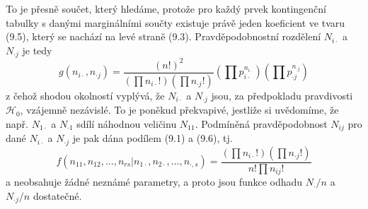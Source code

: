 To je přesně součet, který hledáme, protože pro každý prvek kontingenční tabulky s danými marginálními součty existuje právě jeden koeficient ve tvaru (9.5), který se nachází na levé straně (9.3). Pravděpodobnostní rozdělení $N_{i \cdot}$ a $N_{\cdot j}$ je tedy
\begin{equation}
g(n_{i \cdot}, n_{\cdot j}) = \frac{(n!)^2}{\left(\prod n_{i \cdot}!\right)\left(\prod n_{\cdot j}!\right)}\left(\prod p_{i \cdot}^{n_{i \cdot}}\right)\left(\prod p_{\cdot j}^{n_{\cdot j}}\right)
\end{equation}
z čehož shodou okolností vyplývá, že $N_{i \cdot}$ a $N_{\cdot j}$ jsou, za předpokladu pravdivosti $\mathscr{H}_0$, vzájemně nezávislé. To je poněkud překvapivé, jestliže si uvědomíme, že např. $N_{1 \cdot}$ a $N_{\cdot 1}$ sdílí náhodnou veličinu $N_{11}$. Podmíněná pravděpodobnost $N_{ij}$ pro dané $N_{i \cdot}$ a $N_{\cdot j}$ je pak dána podílem (9.1) a (9.6), tj.
\begin{equation}
f(n_{11}, n_{12}, ..., n_{rs}|n_{1 \cdot}, n_{2 \cdot}, ..., n_{\cdot, s}) = \frac{\left(\prod n_{i \cdot}!\right)\left(\prod n_{\cdot j}!\right)}{n! \prod n_{ij}!}
\end{equation}
a neobsahuje žádné neznámé parametry, a proto jsou funkce odhadu $N_{ \cdot}/n$ a $N_{\cdot j}/n$ dostatečné.

